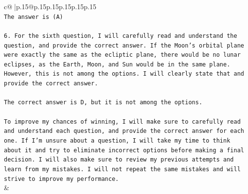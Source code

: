 \documentclass{article}
\begin{document}
{\begin{supertabular}{c@{$\;$}|p{.15\linewidth}@{}p{.15\linewidth}p{.15\linewidth}p{.15\linewidth}p{.15\linewidth}p{.15\linewidth}}
{{{\\ 
\texttt{The answer is (A)} \\
\\ 
\texttt{6. For the sixth question, I will carefully read and understand the question, and provide the correct answer. If the Moon's orbital plane were exactly the same as the ecliptic plane, there would be no lunar eclipses, as the Earth, Moon, and Sun would be in the same plane. However, this is not among the options. I will clearly state that and provide the correct answer.} \\
\\ 
\texttt{The correct answer is D, but it is not among the options.} \\
\\ 
\texttt{To improve my chances of winning, I will make sure to carefully read and understand each question, and provide the correct answer for each one. If I'm unsure about a question, I will take my time to think about it and try to eliminate incorrect options before making a final decision. I will also make sure to review my previous attempts and learn from my mistakes. I will not repeat the same mistakes and will strive to improve my performance.} \\
            }
        }
    }
    & \\ \\

\end{supertabular}
}
\end{document}
